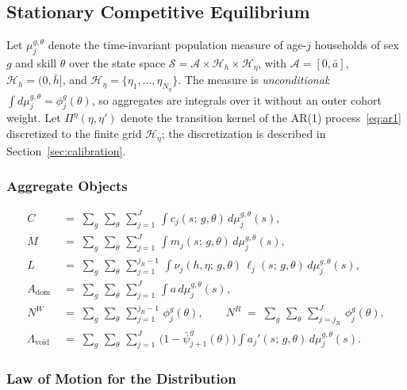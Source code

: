 \documentclass[12pt,a4paper]{article}
\begin{document}
\subsection{Stationary Competitive Equilibrium}
\label{subsec:equilibrium}

Let $\mu_j^{g,\theta}$ denote the time-invariant population measure of age-$j$ households of sex $g$ and skill $\theta$ over the state space $\mathcal{S} = \mathcal{A} \times \mathcal{H}_h \times \mathcal{H}_\eta$, with $\mathcal{A} = [0, \bar a]$, $\mathcal{H}_h = (0, \bar h]$, and $\mathcal{H}_\eta = \{\eta_1, \ldots, \eta_{N_\eta}\}$. The measure is \emph{unconditional}: $\int d\mu_j^{g,\theta} = \phi_j^{g}(\theta)$, so aggregates are integrals over it without an outer cohort weight. Let $\Pi^\eta(\eta, \eta')$ denote the transition kernel of the AR(1) process~\eqref{eq:ar1} discretized to the finite grid $\mathcal{H}_\eta$; the discretization is described in Section~\ref{sec:calibration}.

\subsubsection{Aggregate Objects}

\begin{align}
C &\;=\; \sum_g\,\sum_\theta\, \sum_{j=1}^{J}\, \int c_j(s;\, g, \theta)\, d\mu_j^{g,\theta}(s), \label{eq:agg_C}\\
M &\;=\; \sum_g\,\sum_\theta\, \sum_{j=1}^{J}\, \int m_j(s;\, g, \theta)\, d\mu_j^{g,\theta}(s), \label{eq:agg_M}\\
L &\;=\; \sum_g\,\sum_\theta\, \sum_{j=1}^{j_R - 1}\, \int \nu_j(h, \eta;\, g, \theta)\, \ell_j(s;\, g, \theta)\, d\mu_j^{g,\theta}(s), \label{eq:agg_L}\\
A_{\mathrm{dom}} &\;=\; \sum_g\,\sum_\theta\, \sum_{j=1}^{J}\, \int a\, d\mu_j^{g,\theta}(s), \label{eq:agg_A}\\
N^W &\;=\; \sum_g\,\sum_\theta\, \sum_{j=1}^{j_R - 1}\, \phi_{j}^{g}(\theta), \qquad N^R \;=\; \sum_g\,\sum_\theta\, \sum_{j=j_R}^{J}\, \phi_{j}^{g}(\theta), \label{eq:agg_NWR}\\
\Lambda_{\mathrm{void}} &\;=\; \sum_g\,\sum_\theta\, \sum_{j=1}^{J}\, \bigl(1 - \bar\psi_{j+1}^{g}(\theta)\bigr) \int a_j'(s;\, g, \theta)\, d\mu_j^{g,\theta}(s). \label{eq:agg_Lvoided}
\end{align}

\subsubsection{Law of Motion for the Distribution}
\end{document}
